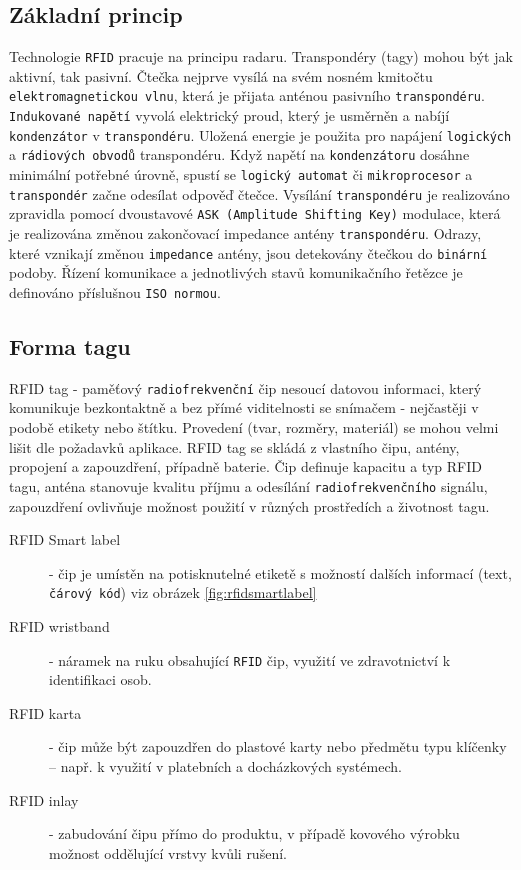 \documentclass[czech,BP]{thesiskiv}
\begin{document}
\subsection{Základní princip}
Technologie \texttt{RFID} pracuje na principu radaru. Transpondéry (tagy) mohou být jak aktivní, tak pasivní. Čtečka nejprve vysílá na svém nosném kmitočtu \texttt{elektromagnetickou vlnu}, která je přijata anténou pasivního \texttt{transpondéru}. \texttt{Indukované napětí} vyvolá elektrický proud, který je usměrněn a nabíjí \texttt{kondenzátor} v \texttt{transpondéru}. Uložená energie je použita pro napájení \texttt{logických} a \texttt{rádiových obvodů} transpondéru. Když napětí na \texttt{kondenzátoru} dosáhne minimální potřebné úrovně, spustí se \texttt{logický automat} či \texttt{mikroprocesor} a \texttt{transpondér} začne odesílat odpověď čtečce. Vysílání \texttt{transpondéru} je realizováno zpravidla pomocí dvoustavové \texttt{ASK (Amplitude Shifting Key)} modulace, která je realizována změnou zakončovací impedance antény \texttt{transpondéru}. Odrazy, které vznikají změnou \texttt{impedance} antény, jsou detekovány čtečkou do \texttt{binární} podoby. Řízení komunikace a jednotlivých stavů komunikačního řetězce je definováno příslušnou \texttt{ISO normou}.\cite{dolevcek2010identifikace}


\subsection{Forma tagu}
RFID tag - paměťový \texttt{radiofrekvenční} čip nesoucí datovou informaci, který komunikuje bezkontaktně a bez přímé viditelnosti se snímačem - nejčastěji v podobě etikety nebo štítku. Provedení (tvar, rozměry, materiál) se mohou velmi lišit dle požadavků aplikace. RFID tag se skládá z vlastního čipu, antény, propojení a zapouzdření, případně baterie. Čip definuje kapacitu a typ RFID tagu, anténa stanovuje kvalitu příjmu a odesílání \texttt{radiofrekvenčního} signálu, zapouzdření ovlivňuje možnost použití v různých prostředích a životnost tagu.\cite{dolevcek2010identifikace}

\newpage
\begin{description}
\item [RFID Smart label]
- čip je umístěn na potisknutelné etiketě s možností dalších informací (text, \texttt{čárový kód}) viz obrázek \ref{fig:rfidsmartlabel}
\item [RFID wristband] - náramek na ruku obsahující \texttt{RFID} čip,  využití ve zdravotnictví k identifikaci osob.
\item [RFID karta] - čip může být zapouzdřen do plastové karty nebo předmětu typu klíčenky – např. k využití v platebních a docházkových systémech.
\item [RFID inlay] - zabudování čipu přímo do produktu, v případě kovového výrobku možnost oddělující vrstvy kvůli rušení.
\end{description}
\end{document}

